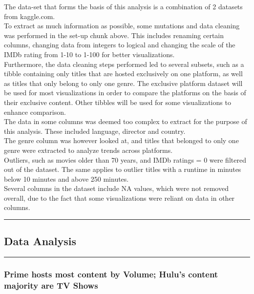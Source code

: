 \documentclass[
]{article}
\begin{document}
The data-set that forms the basis of this analysis is a combination of 2
datasets from kaggle.com.\\
To extract as much information as possible, some mutations and data
cleaning was performed in the set-up chunk above. This includes renaming
certain columns, changing data from integers to logical and changing the
scale of the IMDb rating from 1-10 to 1-100 for better visualizations.\\
Furthermore, the data cleaning steps performed led to several subsets,
such as a tibble containing only titles that are hosted exclusively on
one platform, as well as titles that only belong to only one genre. The
exclusive platform dataset will be used for most visualizations in order
to compare the platforms on the basis of their exclusive content. Other
tibbles will be used for some visualizations to enhance comparison.\\
The data in some columns was deemed too complex to extract for the
purpose of this analysis. These included language, director and
country.\\
The genre column was however looked at, and titles that belonged to only
one genre were extracted to analyze trends across platforms.\\
Outliers, such as movies older than 70 years, and IMDb ratings = 0 were
filtered out of the dataset. The same applies to outlier titles with a
runtime in minutes below 10 minutes and above 250 minutes.\\
Several columns in the dataset include NA values, which were not removed
overall, due to the fact that some visualizations were reliant on data
in other columns.

\begin{center}\rule{0.5\linewidth}{0.5pt}\end{center}

\hypertarget{data-analysis}{%
\subsection{Data Analysis}\label{data-analysis}}

\begin{center}\rule{0.5\linewidth}{0.5pt}\end{center}

\hypertarget{prime-hosts-most-content-by-volume-hulus-content-majority-are-tv-shows}{%
\subsubsection{Prime hosts most content by Volume; Hulu's content
majority are TV
Shows}\label{prime-hosts-most-content-by-volume-hulus-content-majority-are-tv-shows}}
\end{document}
